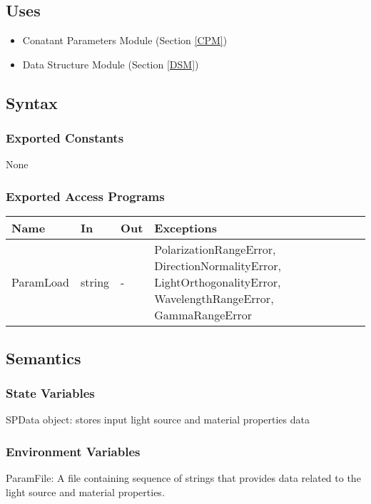 \documentclass[12pt, titlepage]{article}
\begin{document}
	\subsection{Uses} \begin{itemize} \item Conatant Parameters Module (Section
		\ref{CPM}) \item Data Structure Module (Section \ref{DSM})
		
	\end{itemize}
	
	\subsection{Syntax}
	
	\subsubsection{Exported Constants} None
	
	\subsubsection{Exported Access Programs}
	
	\begin{center} \begin{tabular}{p{3cm} p{2cm} p{2cm} p{8cm}} \hline \textbf{Name}
			& \textbf{In} & \textbf{Out} & \textbf{Exceptions} \\ \hline ParamLoad & string
			& - & PolarizationRangeError,
			DirectionNormalityError, LightOrthogonalityError,  WavelengthRangeError,
			GammaRangeError\\
			
			\hline \end{tabular} \end{center}
	
	\subsection{Semantics}
	
	\subsubsection{State Variables}
	
	SPData object: stores input light source and material properties data
	
	\subsubsection{Environment Variables} ParamFile: A file containing sequence of
	strings that provides data related to the light source and material
	properties.
	
\end{document}
